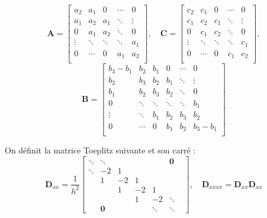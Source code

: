 \documentclass[a4,12pt]{article}
\newcommand{\A}{\mathbf{A}}
\newcommand{\B}{\mathbf{B}}
\newcommand{\C}{\mathbf{C}}
\newcommand{\D}{\mathbf{D}}
\begin{document}
	    \[
	      \A=
	      \begin{bmatrix} 
		a_2 & a_1 & 0 & \cdots & 0 \\ 
		a_1 & a_2 & a_1 & \ddots & \vdots \\ 
		0 & a_1 & a_2 & \ddots  & 0 \\ 
		\vdots & \ddots & \ddots & \ddots  & a_1 \\ 
		0 & \cdots & 0 & a_1 & a_2  \\
	      \end{bmatrix},\quad 
	      \C=
	      \begin{bmatrix} 
		c_2 & c_1 & 0 & \cdots & 0 \\ 
		c_1 & c_2 & c_1 & \ddots & \vdots \\ 
		0 & c_1 & c_2 & \ddots  & 0 \\ 
		\vdots & \ddots & \ddots & \ddots  & c_1 \\ 
		0 & \cdots & 0 & c_1 & c_2  \\
	      \end{bmatrix},
	    \]
	    \[
	      \B=
	      \begin{bmatrix}
		b_3-b_1 & b_2 & b_1 & 0 & \cdots & 0  \\ 
		b_2 & b_3 & b_2 & b_1 & \ddots & \vdots \\  
		b_1 & b_2 & b_3 & b_2 & \ddots & 0 \\ 
		0 & \ddots & \ddots & \ddots & \ddots &b_1\\ 
		\vdots & \ddots & b_1 & b_2 & b_3 & b_2  \\ 
		0 & \cdots &  0 & b_1 & b_2 & b_3-b_1  \\
	      \end{bmatrix}
	    \]

	    On définit la matrice Toeplitz suivante et son carré : 
	    \[
	      \D_{xx}=\frac{1}{h^2}
	      \begin{bmatrix}
		\ddots & \ddots & & & & \mathbf{0}  & \\
		\ddots & -2 & 1 & & & & \\ 
		& 1 & -2 & 1 & & & \\ 
		& & 1 & -2 & 1 & & \\ 
		& & & 1 & -2 & \ddots \\ 
		& \mathbf{0} & & & \ddots & \ddots
	      \end{bmatrix}, 
	      \quad \D_{xxxx}=\D_{xx}\D_{xx}
	    \]

\end{document}
